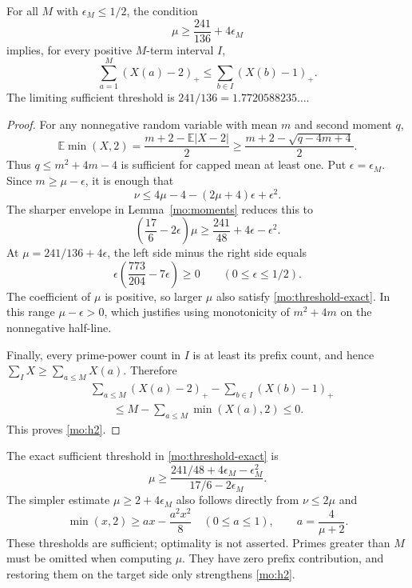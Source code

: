 \begin{theorem}
\label{mo:threshold}
For all $M$ with $\epsilon_M\le1/2$, the condition
\begin{equation}
 \mu\ge\frac{241}{136}+4\epsilon_M
 \label{mo:threshold-simple}
\end{equation}
implies, for every positive $M$-term interval $I$,
\begin{equation}
 \sum_{a=1}^M(X(a)-2)_+
 \le\sum_{b\in I}(X(b)-1)_+.
 \label{mo:h2}
\end{equation}
The limiting sufficient threshold is
$241/136=1.7720588235\ldots$.
\end{theorem}

\begin{proof}
For any nonnegative random variable with mean $m$ and second moment $q$,
\[
 \mathbb E\min(X,2)
 =\frac{m+2-\mathbb E|X-2|}{2}
 \ge\frac{m+2-\sqrt{q-4m+4}}2.
\]
Thus $q\le m^2+4m-4$ is sufficient for capped mean at least one.
Put $\epsilon=\epsilon_M$. Since $m\ge\mu-\epsilon$, it is enough that
\[
 \nu\le4\mu-4-(2\mu+4)\epsilon+\epsilon^2.
\]
The sharper envelope in Lemma~\ref{mo:moments} reduces this to
\begin{equation}
 \left(\frac{17}{6}-2\epsilon\right)\mu
 \ge\frac{241}{48}+4\epsilon-\epsilon^2.
 \label{mo:threshold-exact}
\end{equation}
At $\mu=241/136+4\epsilon$, the left side minus the right side equals
\[
 \epsilon\left(\frac{773}{204}-7\epsilon\right)\ge0
 \qquad(0\le\epsilon\le1/2).
\]
The coefficient of $\mu$ is positive, so larger $\mu$ also satisfy
\eqref{mo:threshold-exact}. In this range $\mu-\epsilon>0$, which
justifies using monotonicity of $m^2+4m$ on the nonnegative half-line.

Finally, every prime-power count in $I$ is at least its prefix count,
and hence $\sum_I X\ge\sum_{a\le M}X(a)$. Therefore
\[
 \begin{split}
 &\sum_{a\le M}(X(a)-2)_+-\sum_{b\in I}(X(b)-1)_+\\
 &\qquad\le M-\sum_{a\le M}\min(X(a),2)\le0.
 \end{split}
\]
This proves \eqref{mo:h2}.
\end{proof}

The exact sufficient threshold in \eqref{mo:threshold-exact} is
\[
 \mu\ge
 \frac{241/48+4\epsilon_M-\epsilon_M^2}{17/6-2\epsilon_M}.
\]
The simpler estimate $\mu\ge2+4\epsilon_M$ also follows directly
from $\nu\le2\mu$ and
\[
 \min(x,2)\ge ax-\frac{a^2x^2}{8}\quad(0\le a\le1),
 \qquad a=\frac4{\mu+2}.
\]
These thresholds are sufficient; optimality is not asserted.
Primes greater than $M$ must be omitted when computing $\mu$.
They have zero prefix contribution, and restoring them on the target
side only strengthens \eqref{mo:h2}.

